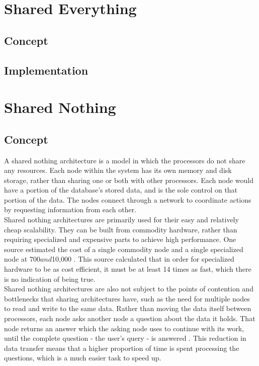 \documentclass[onecolumn, draftclsnofoot,10pt, compsoc]{IEEEtran}
\begin{document}
	\newpage
	\tableofcontents
	\clearpage
	
	\section{Shared Everything}

    \subsection{Concept}

    \subsection{Implementation}

	\section{Shared Nothing}
	
    \subsection{Concept}
    \indent A shared nothing architecture is a model in which the processors do not share any resources. Each node within the system has its own memory and disk storage, rather than sharing one or both with other processors. Each node would have a portion of the database’s stored data, and is the sole control on that portion of the data. The nodes connect through a network to coordinate actions by requesting information from each other. \\

\indent Shared nothing architectures are primarily used for their easy and relatively cheap scalability. They can be built from commodity hardware, rather than requiring specialized and expensive parts to achieve high performance. One source estimated the cost of a single commodity node and a single specialized node at $700 and $10,000 \cite{HiPerf}. This source calculated that in order for specialized hardware to be as cost efficient, it must be at least 14 times as fast, which there is no indication of being true. \\

\indent Shared nothing architectures are also not subject to the points of contention and bottlenecks that sharing architectures have, such as the need for multiple nodes to read and write to the same data. Rather than moving the data itself between processors, each node asks another node a question about the data it holds. That node returns an answer which the asking node uses to continue with its work, until the complete question - the user’s query - is answered \cite{DeWittFuture}. This reduction in data transfer means that a higher proportion of time is spent processing the questions, which is a much easier task to speed up. \\
\end{document}
